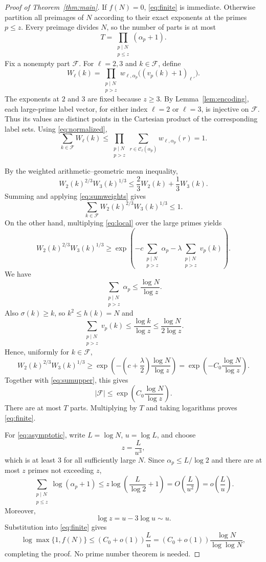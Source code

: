 \documentclass[11pt,a4paper]{article}
\theoremstyle{remark}
\newcommand{\CC}{\mathcal C}
\newcommand{\FF}{\mathcal F}
\begin{document}
\begin{proof}[Proof of Theorem~\ref{thm:main}]
If $f(N)=0$, \eqref{eq:finite} is immediate. Otherwise partition all preimages of $N$ according to their exact exponents at the primes $p\le z$. Every preimage divides $N$, so the number of parts is at most
\[
T=\prod_{\substack{p\mid N\\p\le z}}(\alpha_p+1).
\]
Fix a nonempty part $\FF$. For $\ell=2,3$ and $k\in\FF$, define
\[
W_\ell(k)=\prod_{\substack{p\mid N\\p>z}}
 w_{\ell,\alpha_p}\bigl((v_p(k)+1)_{\ell'}\bigr).
\]
The exponents at $2$ and $3$ are fixed because $z\ge3$. By Lemma~\ref{lem:encoding}, each large-prime label vector, for either index $\ell=2$ or $\ell=3$, is injective on $\FF$. Thus its values are distinct points in the Cartesian product of the corresponding label sets. Using \eqref{eq:normalized},
\begin{equation}\label{eq:sumweights}
\sum_{k\in\FF}W_\ell(k)
\le\prod_{\substack{p\mid N\\p>z}}
   \sum_{r\in\CC_\ell(\alpha_p)}w_{\ell,\alpha_p}(r)
=1.
\end{equation}

By the weighted arithmetic--geometric mean inequality,
\[
W_2(k)^{2/3}W_3(k)^{1/3}
\le\frac23W_2(k)+\frac13W_3(k).
\]
Summing and applying \eqref{eq:sumweights} gives
\begin{equation}\label{eq:sumupper}
\sum_{k\in\FF}W_2(k)^{2/3}W_3(k)^{1/3}\le1.
\end{equation}
On the other hand, multiplying \eqref{eq:local} over the large primes yields
\[
W_2(k)^{2/3}W_3(k)^{1/3}
\ge\exp\!\left(-c\sum_{\substack{p\mid N\\p>z}}\alpha_p
                 -\lambda\sum_{\substack{p\mid N\\p>z}}v_p(k)\right).
\]
We have
\[
\sum_{\substack{p\mid N\\p>z}}\alpha_p
\le\frac{\log N}{\log z}.
\]
Also $\sigma(k)\ge k$, so $k^2\le h(k)=N$ and
\[
\sum_{\substack{p\mid N\\p>z}}v_p(k)
\le\frac{\log k}{\log z}
\le\frac{\log N}{2\log z}.
\]
Hence, uniformly for $k\in\FF$,
\[
W_2(k)^{2/3}W_3(k)^{1/3}
\ge\exp\!\left(-\left(c+\frac\lambda2\right)
                       \frac{\log N}{\log z}\right)
=\exp\!\left(-C_0\frac{\log N}{\log z}\right).
\]
Together with \eqref{eq:sumupper}, this gives
\[
|\FF|\le\exp\!\left(C_0\frac{\log N}{\log z}\right).
\]
There are at most $T$ parts. Multiplying by $T$ and taking logarithms proves \eqref{eq:finite}.

For \eqref{eq:asymptotic}, write $L=\log N$, $u=\log L$, and choose
\[
z=\frac{L}{u^3},
\]
which is at least $3$ for all sufficiently large $N$. Since $\alpha_p\le L/\log2$ and there are at most $z$ primes not exceeding $z$,
\[
\sum_{\substack{p\mid N\\p\le z}}\log(\alpha_p+1)
\le z\log\!\left(\frac L{\log2}+1\right)
=O\!\left(\frac L{u^2}\right)
=o\!\left(\frac L u\right).
\]
Moreover,
\[
\log z=u-3\log u\sim u.
\]
Substitution into \eqref{eq:finite} gives
\[
\log\max\{1,f(N)\}
\le(C_0+o(1))\frac L u
=(C_0+o(1))\frac{\log N}{\log\log N},
\]
completing the proof. No prime number theorem is needed.
\end{proof}
\end{document}
